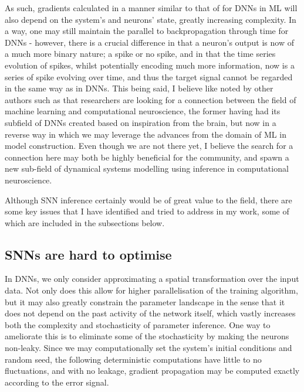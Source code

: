 \documentclass[mphil,deptreport,ai]{infthesis} %
\begin{document}
As such, gradients calculated in a manner similar to that of for DNNs in ML will also depend on the system's and neurons' state, greatly increasing complexity.
In a way, one may still maintain the parallel to backpropagation through time for DNNs - however, there is a crucial difference in that a neuron's output is now of a much more binary nature; a spike or no spike, and in that the time series evolution of spikes, whilst potentially encoding much more information, now is a series of spike evolving over time, and thus the target signal cannot be regarded in the same way as in DNNs.
This being said, I believe like noted by other authors such as \cite{Sindaci2018StatisticalFunction} that researchers are looking for a connection between the field of machine learning and computational neuroscience, the former having had its subfield of DNNs created based on inspiration from the brain, but now in a reverse way in which we may leverage the advances from the domain of ML in model construction.
Even though we are not there yet, I believe the search for a connection here may both be highly beneficial for the community, and spawn a new sub-field of dynamical systems modelling using inference in computational neuroscience.

Although SNN inference certainly would be of great value to the field, there are some key issues that I have identified and tried to address in my work, some of which are included in the subsections below.

\subsection{SNNs are hard to optimise}
In DNNs, we only consider approximating a spatial transformation over the input data. Not only does this allow for higher parallelisation of the training algorithm, but it may also greatly constrain the parameter landscape in the sense that it does not depend on the past activity of the network itself, which vastly increases both the complexity and stochasticity of parameter inference. 
One way to ameliorate this is to eliminate some of the stochasticity by making the neurons non-leaky. Since we may computationally set the system’s initial conditions and random seed, the following deterministic computations have little to no fluctuations, and with no leakage, gradient propagation may be computed exactly according to the error signal.
\end{document}
